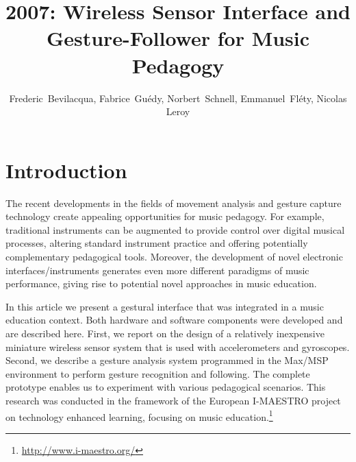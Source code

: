 
\graphicspath{ {mainmatter/Bevilacqua_2007/} }
\title*{2007: Wireless Sensor Interface and Gesture-Follower for Music Pedagogy}
\author{Frederic~Bevilacqua, Fabrice~Gu\'edy, Norbert~Schnell, Emmanuel~Fl\'ety, Nicolas Leroy}
%
%
\maketitle


\section{Introduction}

The recent developments in the fields of movement analysis and gesture capture technology create appealing opportunities for music pedagogy. For example, traditional instruments can be augmented to provide control over digital musical processes, altering standard instrument practice and offering potentially complementary pedagogical tools. Moreover, the development of novel electronic interfaces/instruments generates even more different paradigms of music performance, giving rise to potential novel approaches in music education. 

In this article we present a gestural interface that was integrated in a music education context. Both hardware and software components were developed and are described here. First, we report on the design of a relatively inexpensive miniature wireless sensor system that is used with accelerometers and gyroscopes. Second, we describe a gesture analysis system programmed in the Max/MSP environment to perform gesture recognition and following. The complete prototype enables us to experiment with various pedagogical scenarios. This research was conducted in the framework of the European I-MAESTRO project on technology enhanced learning, focusing on music education.\footnote{\url{http://www.i-maestro.org/}}

